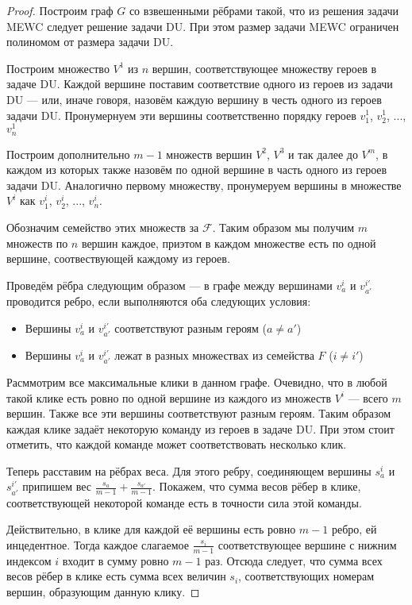 \documentclass{article}
\begin{document}
\begin{proof}
    Построим граф $G$ со взвешенными рёбрами такой, что из решения задачи MEWC следует решение задачи DU. При этом размер задачи MEWC ограничен полиномом от размера задачи DU. 
    
    Построим множество $V^1$ из $n$ вершин, соответствующее множеству героев в задаче DU. Каждой вершине поставим соответствие одного из героев из задачи DU --- или, иначе говоря, назовём каждую вершину в честь одного из героев задачи DU. Пронумернуем эти вершины соответственно порядку героев $v_1^1$, $v_2^1$, ..., $v_n^1$
    
    Построим дополнительно $m-1$ множеств вершин $V^2$, $V^3$ и так далее до $V^m$, в каждом из которых также назовём по одной вершине в часть одного из героев задачи DU. Аналогично первому множеству, пронумеруем вершины в множестве $V^i$ как $v_1^i$, $v_2^i$, ..., $v_n^i$.
    
    Обозначим семейство этих множеств за $\mathcal{F}$. Таким образом мы получим $m$ множеств по $n$ вершин каждое, приэтом в каждом множестве есть по одной вершине, соотвествующей каждому из героев.
    
    Проведём рёбра следующим образом --- в графе между вершинами $v_a^i$ и $v_{a'}^{i'}$ проводится ребро, если выполняются оба следующих условия:
    \begin{itemize}
        \item Вершины $v_a^i$ и $v_{a'}^{i'}$ соответствуют разным героям ($a \neq a'$)
        \item Вершины $v_a^i$ и $v_{a'}^{i'}$ лежат в разных множествах из семейства $F$ ($i \neq i'$)
    \end{itemize}
    
    Расммотрим все максимальные клики в данном графе. Очевидно, что в любой такой клике есть ровно по одной вершине из каждого из множеств $V^i$ --- всего $m$ вершин. Также все эти вершины соответствуют разным героям. Таким образом каждая клике задаёт некоторую команду из героев в задаче DU. При этом стоит отметить, что каждой команде может соответствовать несколько клик.
    
    Теперь расставим на рёбрах веса. Для этого ребру, соединяющем вершины $s_a^i$ и $s_{a'}^{i'}$ припишем вес $\frac{s_a}{m-1} + \frac{s_{a'}}{m-1}$. Покажем, что сумма весов рёбер в клике, соответствующей некоторой команде есть в точности сила этой команды. 
    
    Действительно, в клике для каждой её вершины есть ровно $m-1$ ребро, ей инцедентное. Тогда каждое слагаемое $\frac{s_i}{m-1}$ соответствующее вершине с нижним индексом $i$ входит в сумму ровно $m-1$ раз. Отсюда следует, что сумма всех весов рёбер в клике есть сумма всех величин $s_i$, соответствующих номерам вершин, образующим данную клику.
\end{proof}
\end{document}
